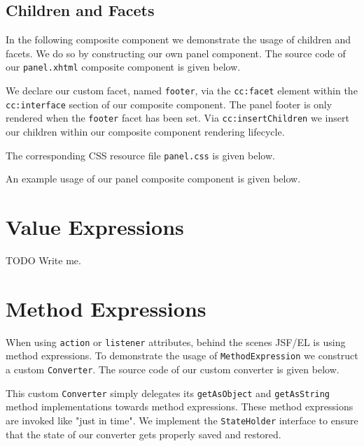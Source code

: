 \subsection{Children and Facets}
In the following composite component we demonstrate the usage of children and facets.
We do so by constructing our own panel component.
The source code of our \texttt{panel.xhtml} composite component is given below.

We declare our custom facet, named \texttt{footer},
via the \texttt{cc:facet} element within the \texttt{cc:interface} section of our composite component.
The panel footer is only rendered when the \texttt{footer} facet has been set.
Via \texttt{cc:insertChildren} we insert our children within our composite component rendering lifecycle.

The corresponding CSS resource file \texttt{panel.css} is given below.


An example usage of our panel composite component is given below.


\section{Value Expressions}
\begin{TODO}{TODO}
	Write me.
\end{TODO}

\section{Method Expressions}
When using \texttt{action} or \texttt{listener} attributes, behind the scenes JSF/EL is using method expressions.
To demonstrate the usage of \texttt{MethodExpression} we construct a custom \texttt{Converter}.
The source code of our custom converter is given below.

This custom \texttt{Converter} simply delegates its \texttt{getAsObject} and \texttt{getAsString} method implementations towards method expressions.
These method expressions are invoked like "just in time".
We implement the \texttt{StateHolder} interface to ensure that the state of our converter gets properly saved and restored.

